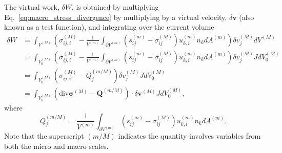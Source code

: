 \documentclass[12pt,aps,pre]{revtex4}
\begin{document}
The virtual work, $\delta W$, is obtained by multiplying Eq.\ \eqref{eq:macro_stress_divergence} by multiplying by a virtual velocity, $\delta \pmb{v}$ (also known as a test function), and integrating over the current volume \cite{JavierBonet:2008uxa}
%
\begin{align}
\delta W &= \int_{V^{(M)}} \left(\sigma_{ij,i}^{(M)} - \frac{1}{V^{(m)}} \int_{\partial V^{(m)}} \left( s_{ij}^{(m)} - \sigma_{ij}^{(M)} \right)u_{k,i}^{(m)} n_k dA^{(m)} \right)  \delta v_j^{(M)}  dV^{(M)} \nonumber\\
%
&= \int_{V_0^{(M)}} \left(\sigma_{ij,i}^{(M)} - \frac{1}{V^{(m)}} \int_{\partial V^{(m)}} \left( s_{ij}^{(m)} - \sigma_{ij}^{(M)} \right)u_{k,i}^{(m)} n_k dA^{(m)} \right)  \delta v_j^{(M)}J dV_0^{(M)}  \nonumber\\
%
&= \int_{V_0^{(M)}} \left(\sigma_{ij,i}^{(M)} - Q_j^{(m/M)} \right) \delta v_j^{(M)}J dV_0^{(M)}   \nonumber\\
%
&= \int_{V_0^{(M)}} \left(\text{div}\pmb{\sigma}^{(M)} - \pmb{Q}^{(m/M)} \right)  \cdot \delta \pmb{v}^{(M)}J dV_0^{(M)} ,
\label{eq:virtual_work}
\end{align}
%
where  
%
\begin{equation}
Q_j^{(m/M)} = \frac{1}{V^{(m)}} \int_{\partial V^{(m)}} \left( s_{ij}^{(m)} - \sigma_{ij}^{(M)} \right)u_{k,i}^{(m)} n_k dA^{(m)}.
\end{equation}
%
Note that the superscript $(m/M)$ indicates the quantity involves variables from both the micro and macro scales. 
\end{document}
